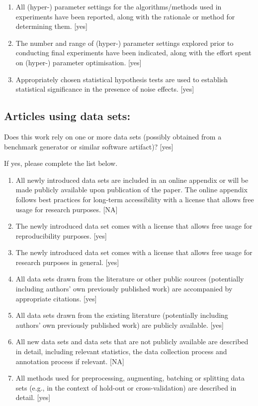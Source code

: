 \documentclass[manuscript, screen, review]{jair}
\begin{document}
\begin{enumerate}
    [yes]
    \item 
    All (hyper-) parameter settings for 
    the algorithms/methods used in experiments have been reported, along with the rationale or method for determining them. 
    [yes]
    \item 
    The number and range of (hyper-) parameter settings explored prior to conducting final experiments have been indicated, along with the effort spent on (hyper-) parameter optimisation. 
    [yes]
    \item 
    Appropriately chosen statistical hypothesis tests are used to establish statistical significance
    in the presence of noise effects.
    [yes]
\end{enumerate}


\subsection*{Articles using data sets:}
Does this work rely on one or more data sets (possibly obtained from a benchmark generator or similar software artifact)? 
[yes]

If yes, please complete the list below.
\begin{enumerate}
    \item 
    All newly introduced data sets 
    are included in an online appendix 
    or will be made publicly available upon publication of the paper.
    The online appendix follows best practices for long-term accessibility with a license
    that allows free usage for research purposes.
    [NA]
    \item The newly introduced data set comes with a license that
    allows free usage for reproducibility purposes.
    [yes]
    \item The newly introduced data set comes with a license that
    allows free usage for research purposes in general.
    [yes]
    \item All data sets drawn from the literature or other public sources (potentially including authors' own previously published work) are accompanied by appropriate citations.
    [yes]
    \item All data sets drawn from the existing literature (potentially including authors’ own previously published work) are publicly available. [yes]
    \item All new data sets and data sets that are not publicly available are described in detail, including relevant statistics, the data collection process and annotation process if relevant.
    [NA]
    \item 
    All methods used for preprocessing, augmenting, batching or splitting data sets (e.g., in the context of hold-out or cross-validation)
    are described in detail. [yes]
\end{enumerate}
\end{document}
